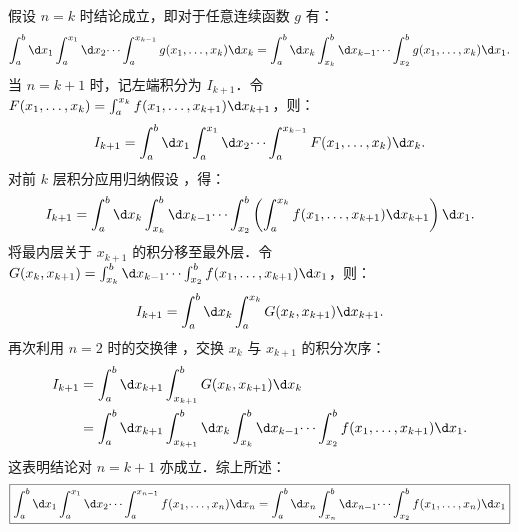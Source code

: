\begin{myproof}
    假设 $n=k$ 时结论成立，即对于任意连续函数 $g$ 有：
    \begin{equation}
        \int_a^b \d x_1 \int_a^{x_1} \d x_2 \dots \int_a^{x_{k-1}} g(x_1, \dots, x_k) \d x_k = \int_a^b \d x_k \int_{x_k}^b \d x_{k-1} \dots \int_{x_2}^b g(x_1, \dots, x_k) \d x_1. \label{eq:induction-hypo}
    \end{equation}
    当 $n=k+1$ 时，记左端积分为 $I_{k+1}$．令 $F(x_1, \dots, x_k) = \int_a^{x_k} f(x_1, \dots, x_{k+1}) \d x_{k+1}$，则：
    \begin{equation}
        I_{k+1} = \int_a^b \d x_1 \int_a^{x_1} \d x_2 \dots \int_a^{x_{k-1}} F(x_1, \dots, x_k) \d x_k.
    \end{equation}
    对前 $k$ 层积分应用归纳假设 ，得：
    \begin{equation}
        I_{k+1} = \int_a^b \d x_k \int_{x_k}^b \d x_{k-1} \dots \int_{x_2}^b \left( \int_a^{x_k} f(x_1, \dots, x_{k+1}) \d x_{k+1} \right) \d x_1.
    \end{equation}
    将最内层关于 $x_{k+1}$ 的积分移至最外层．令 $G(x_k, x_{k+1}) = \int_{x_k}^b \d x_{k-1} \dots \int_{x_2}^b f(x_1, \dots, x_{k+1}) \d x_1$，则：
    \begin{equation}
        I_{k+1} = \int_a^b \d x_k \int_a^{x_k} G(x_k, x_{k+1}) \d x_{k+1}.
    \end{equation}
    再次利用 $n=2$ 时的交换律 ，交换 $x_k$ 与 $x_{k+1}$ 的积分次序：
    \begin{equation}
        \begin{aligned}
            I_{k+1} & = \int_a^b \d x_{k+1} \int_{x_{k+1}}^b G(x_k, x_{k+1}) \d x_k                                                           \\
                    & = \int_a^b \d x_{k+1} \int_{x_{k+1}}^b \d x_k \int_{x_k}^b \d x_{k-1} \dots \int_{x_2}^b f(x_1, \dots, x_{k+1}) \d x_1.
        \end{aligned}
    \end{equation}
    这表明结论对 $n=k+1$ 亦成立．综上所述：
    \begin{equation}
        \boxed{\int_a^b \d x_1 \int_a^{x_1} \d x_2 \dots \int_a^{x_{n-1}} f(x_1, \dots, x_n) \d x_n = \int_a^b \d x_n \int_{x_n}^b \d x_{n-1} \dots \int_{x_2}^b f(x_1, \dots, x_n) \d x_1}
    \end{equation}
\end{myproof}





\endinput
